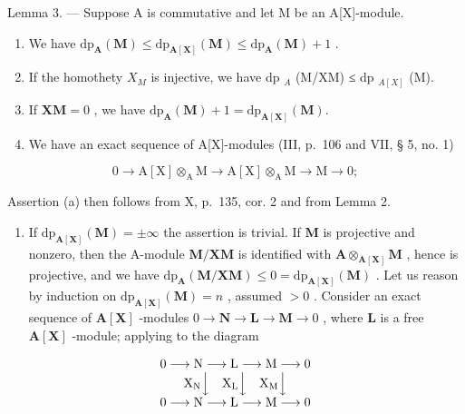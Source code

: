 Lemma 3. --- Suppose A is commutative and let M be an A{[}X{]}-module.

\begin{enumerate}
\def\labelenumi{\alph{enumi})}
\item
  We have \(\mathrm{dp}_{\mathbf{A}}(\mathbf{M}) \leqslant \mathrm{dp}_{\mathbf{A}[\mathbf{X}]}(\mathbf{M}) \leqslant \mathrm{dp}_{\mathbf{A}}(\mathbf{M}) + 1\) .
\item
  If the homothety \(X_{M}\) is injective, we have dp \(_{A}\) (M/XM) ≤ dp \(_{A[X]}\) (M).
\item
  If \(\mathbf{XM} = 0\) , we have \(\mathrm{dp}_{\mathbf{A}}(\mathbf{M}) + 1 = \mathrm{dp}_{\mathbf{A}[\mathbf{X}]}(\mathbf{M}).\)
\item
  We have an exact sequence of A{[}X{]}-modules (III, p.~106 and VII, § 5, no. 1)
\end{enumerate}

\[
0 \rightarrow \mathrm{A} [ \mathrm{X} ] \otimes_ {\mathrm{A}} \mathrm{M} \rightarrow \mathrm{A} [ \mathrm{X} ] \otimes_ {\mathrm{A}} \mathrm{M} \rightarrow \mathrm{M} \rightarrow 0;
\]

Assertion (a) then follows from X, p.~135, cor. 2 and from Lemma 2.

\begin{enumerate}
\def\labelenumi{\alph{enumi})}
\setcounter{enumi}{1}
\tightlist
\item
  If \(\mathrm{dp}_{\mathbf{A}[\mathbf{X}]}(\mathbf{M}) = \pm \infty\) the assertion is trivial. If \(\mathbf{M}\) is projective and nonzero, then the A-module \(\mathbf{M} / \mathbf{XM}\) is identified with \(\mathbf{A} \otimes_{\mathbf{A}[\mathbf{X}]} \mathbf{M}\) , hence is projective, and we have \(\mathrm{dp}_{\mathbf{A}}(\mathbf{M} / \mathbf{XM}) \leqslant 0 = \mathrm{dp}_{\mathbf{A}[\mathbf{X}]}(\mathbf{M})\) . Let us reason by induction on \(\mathrm{dp}_{\mathbf{A}[\mathbf{X}]}(\mathbf{M}) = n\) , assumed \(>0\) . Consider an exact sequence of \(\mathbf{A}[\mathbf{X}]\) -modules \(0 \to \mathbf{N} \to \mathbf{L} \to \mathbf{M} \to 0\) , where \(\mathbf{L}\) is a free \(\mathbf{A}[\mathbf{X}]\) -module; applying to the diagram
\end{enumerate}

\[
\begin{array}{c} 0 \longrightarrow \mathrm{N} \longrightarrow \mathrm{L} \longrightarrow \mathrm{M} \longrightarrow 0 \\ \mathrm {X_ {N}} \Big \downarrow \quad \mathrm {X_ {L}} \Big \downarrow \quad \mathrm {X_ {M}} \Big \downarrow \\ 0 \longrightarrow \mathrm{N} \longrightarrow \mathrm{L} \longrightarrow \mathrm{M} \longrightarrow 0 \end{array}
\]

